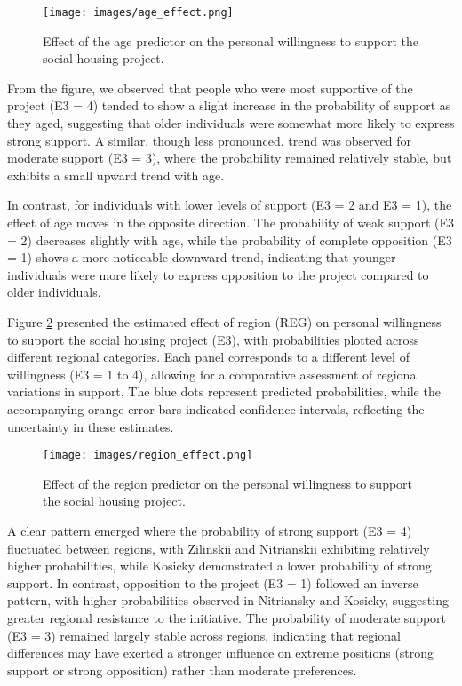 \documentclass[titlepage]{article}
\begin{document}
\begin{figure}[H]
    \centering
    \texttt{[image: images/age\_effect.png]}
    \caption{Effect of the age predictor on the personal willingness to support the social housing project.}
    \label{fig:age_effect}
\end{figure}

\justify
From the figure, we observed that people who were most supportive of the project (E3 = 4) tended to show a slight increase in the probability of support as they aged, suggesting that older individuals were somewhat more likely to express strong support. A similar, though less pronounced, trend was observed for moderate support (E3 = 3), where the probability remained relatively stable, but exhibits a small upward trend with age.

\restoregeometry

\justify
In contrast, for individuals with lower levels of support (E3 = 2 and E3 = 1), the effect of age moves in the opposite direction. The probability of weak support (E3 = 2) decreases slightly with age, while the probability of complete opposition (E3 = 1) shows a more noticeable downward trend, indicating that younger individuals were more likely to express opposition to the project compared to older individuals.

\justify
Figure \ref{fig:reg_effect} presented the estimated effect of region (REG) on personal willingness to support the social housing project (E3), with probabilities plotted across different regional categories. Each panel corresponds to a different level of willingness (E3 = 1 to 4), allowing for a comparative assessment of regional variations in support. The blue dots represent predicted probabilities, while the accompanying orange error bars indicated confidence intervals, reflecting the uncertainty in these estimates.

\begin{figure}[H]
    \centering
    \texttt{[image: images/region\_effect.png]}
    \caption{Effect of the region predictor on the personal willingness to support the social housing project.}
    \label{fig:reg_effect}
\end{figure}

\justify
A clear pattern emerged where the probability of strong support (E3 = 4) fluctuated between regions, with Zilinskii and Nitrianskii exhibiting relatively higher probabilities, while Kosicky demonstrated a lower probability of strong support. In contrast, opposition to the project (E3 = 1) followed an inverse pattern, with higher probabilities observed in Nitriansky and Kosicky, suggesting greater regional resistance to the initiative. The probability of moderate support (E3 = 3) remained largely stable across regions, indicating that regional differences may have exerted a stronger influence on extreme positions (strong support or strong opposition) rather than moderate preferences.
\end{document}
